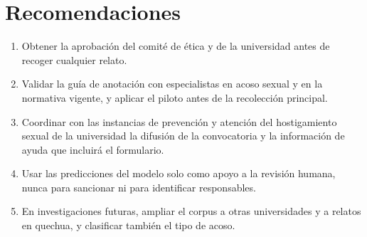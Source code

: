 \chapter*{Recomendaciones}

\begin{enumerate}
	\item Obtener la aprobación del comité de ética y de la universidad antes de recoger cualquier relato.
	\item Validar la guía de anotación con especialistas en acoso sexual y en la normativa vigente, y aplicar el piloto antes de la recolección principal.
	\item Coordinar con las instancias de prevención y atención del hostigamiento sexual de la universidad la difusión de la convocatoria y la información de ayuda que incluirá el formulario.
	\item Usar las predicciones del modelo solo como apoyo a la revisión humana, nunca para sancionar ni para identificar responsables.
	\item En investigaciones futuras, ampliar el corpus a otras universidades y a relatos en quechua, y clasificar también el tipo de acoso.
\end{enumerate}
